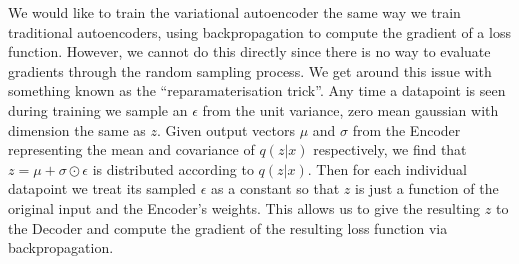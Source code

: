 \documentclass{article}
\numberwithin{figure}{section}
\theoremstyle{definition}
\begin{document}
We would like to train the variational autoencoder the same way we train traditional autoencoders, using backpropagation to compute the gradient of a loss function.
However, we cannot do this directly since there is no way to evaluate gradients through the random sampling process.
We get around this issue with something known as the ``reparamaterisation trick''.
Any time a datapoint is seen during training we sample an $\epsilon$ from the unit variance, zero mean gaussian with dimension the same as $z$.
Given output vectors $\mu$ and $\sigma$ from the Encoder representing the mean and covariance of $q(z|x)$ respectively, we find that $z = \mu + \sigma \odot \epsilon$ is distributed according to $q(z|x)$.
Then for each individual datapoint we treat its sampled $\epsilon$ as a constant so that $z$ is just a function of the original input and the Encoder's weights.
This allows us to give the resulting $z$ to the Decoder and compute the gradient of the resulting loss function via backpropagation.
\end{document}
